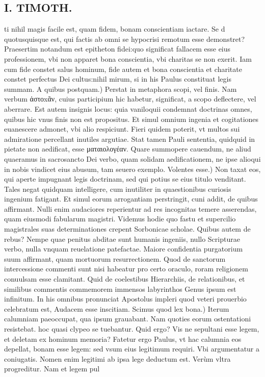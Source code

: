 \documentclass{article}
\begin{document}
\begin{pages}
\section*{I. TIMOTH. }
\marginpar{[ p.6 ]}\pstart ti nihil magis facile est, quam fidem, bonam conscientiam iactare. Se d quotusquisque est, qui factis ab omni se hypocrisi remotum esse demonstret? Praesertim notandum est epitheton fidei:quo significat fallacem esse eius professionem, vbi non apparet bona conscientia, vbi charitas se non exerit. Iam cum fide constet salus hominum, fide autem et bona conscientia et charitate constet perfectus Dei cultus:nihil mirum, si in his Paulus constituat legis summam.  \pend\pstart A quibus postquam.) Perstat in metaphora scopi, vel finis. Nam verbum ἀστοxᾶν, cuius participium hic habetur, significat, a scopo deflectere, vel aberrare. Est autem insignis locus: quia vaniloquii condemnat doctrinas omnes, quibus hic vnus finis non est propositus. Et simul omnium ingenia et cogitationes euanescere admonet, vbi alio respiciunt. Fieri quidem poterit, vt multos sui admiratione percellant inutiles argutiae. Stat tamen Pauli sententia, quidquid in pietate non aedificat, esse ματαιολογέαν. Quare summopere cauendum, ne aliud quaeramus in sacrosancto Dei verbo, quam solidam aedificationem, ne ipse alioqui in nobis vindicet eius abusum, tam seuero exemplo.  \pend\pstart Volentes esse.) Non taxat eos, qui aperte impugnant legis doctrinam, sed qui potius se eius titulo venditant. Tales negat quidquam intelligere, cum inutiliter in quaestionibus curiosis ingenium fatigant. Et simul eorum arrogantiam perstringit, cuni addit, de quibus affirmant. Nulli enim audaciores reperientur ad res incognitas temere asserendas, quam eiusmodi fabularum magistri. Videmus hodie quo fastu et supercilio magistrales suas determinationes crepent Sorbonicae scholae. Quibus autem de rebus? Nempe quae penitus abditae sunt humanis ingeniis, nullo Scripturae verbo, nulla vnquam reuelatione patefactae. Maiore confidentia purgatorium suum affirmant, quam mortuorum resurrectionem. Quod de sanctorum intercessione commenti sunt nisi habeatur pro certo oraculo, roram religionem conuulsam esse clamitant. Quid de coelestibus Hierarchiis, de relationibus, et similibus commentis commemorem immensos labyrinthos Genus ipsum est infinitum. In his omnibus pronunciat Apostolus impleri quod veteri prouerbio celebratum est, Audacem esse inscitiam.  \pend\pstart Scimus quod lex bona.) Iterum calumniam paeoccupat, qua ipsum grauabant. Nam quoties eorum ostentationi resistebat. hoc quasi clypeo se tuebantur. Quid ergo? Vis ne sepultani esse legem, et deletam ex hominum memoria? Fatetur ergo Paulus, vt hac calumnia eos depellat, bonam esse legem: sed vsum eius legitimum requiri. Vbi argumentatur a coniugatis. Nomen enim legitimi ab ipsa lege deductum est. Verùm vltra progreditur. Nam et legem pul\pend

\end{pages}
\end{document}
